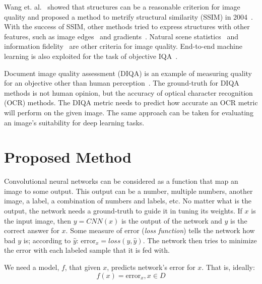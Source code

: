 \documentclass{article}
\begin{document}
Wang et. al.~\cite{wang2002universal} showed that structures can be a reasonable criterion for image quality and proposed a method to metrify structural similarity (SSIM) in 2004~\cite{wang2004image}. With the success of SSIM, other methods tried to express structures with other features, such as image edges~\cite{chen2006edge} and gradients~\cite{Xue2014}. Natural scene statistics~\cite{moorthy2011blind} and information fidelity~\cite{sheikh2006image} are other criteria for image quality. End-to-end machine learning is also exploited for the task of objective IQA~\cite{yang2019survey, ye2012unsupervised,kim2017deep}.

Document image quality assessment (DIQA) is an example of measuring quality for an objective other than human perception~\cite{ye2013document}. The ground-truth for DIQA methods is not human opinion, but the accuracy of optical character recognition (OCR) methods. The DIQA metric needs to predict how accurate an OCR metric will perform on the given image. The same approach can be taken for evaluating an image's suitability for deep learning tasks.


\section{Proposed Method} \label{sec:proposed_method}
Convolutional neural networks can be considered as a function that map an image to some output. This output can be a number, multiple numbers, another image, a label, a combination of numbers and labels, etc. No matter what is the output, the network needs a ground-truth to guide it in tuning its weights. If $x$ is the input image, then $y = CNN(x)$ is the output of the network and $\hat{y}$ is the correct answer for $x$. Some measure of error (\emph{loss function}) tells the network how bad $y$ is; according to $\hat{y}$: $\text{error}_x=loss(y, \hat{y})$. The network then tries to minimize the $\text{error}$ with each labeled sample that it is fed with.

We need a model, $f$, that given $x$, predicts network's error for $x$. That is, ideally:
\begin{equation}
	\label{eq:model}
	f(x) = \text{error}_x, x\in D
\end{equation}
\end{document}
